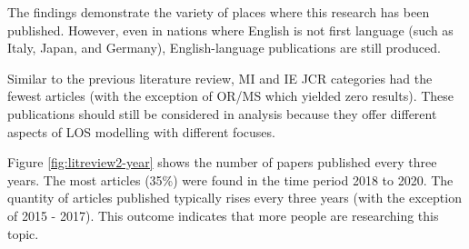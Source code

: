 \documentclass[../thesis.tex]{subfiles}
\begin{document}
\begin{table}[h!]
    \centering
    \caption{Country and JCR Category of Published Research}
    \label{tab:litreview2-countryandjcr}
\end{table}

The findings demonstrate the variety of places where this research has been published. However, even in nations where English is not first language (such as Italy, Japan, and Germany), English-language publications are still produced.

Similar to the previous literature review, MI and IE JCR categories had the fewest articles (with the exception of OR/MS which yielded zero results). These publications should still be considered in analysis because they offer different aspects of LOS modelling with different focuses.

Figure \ref{fig:litreview2-year} shows the number of papers published every three years. The most articles (35\%) were found in the time period 2018 to 2020. The quantity of articles published typically rises every three years (with the exception of 2015 - 2017). This outcome indicates that more people are researching this topic.
\end{document}
